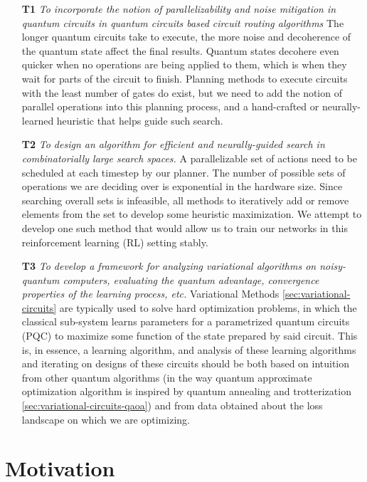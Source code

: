 \begin{enumerate}\label{enum:problems-addressed-by-thesis}
    \item[\textbf{T1}] \textit{To incorporate the notion of parallelizability and noise mitigation in quantum circuits in quantum circuits based circuit routing algorithms}
    The longer quantum circuits take to execute, the more noise and decoherence of the quantum state affect the final results. Quantum states decohere even quicker when no operations are being applied to them, which is when they wait for parts of the circuit to finish. Planning methods to execute circuits with the least number of gates do exist, but we need to add the notion of parallel operations into this planning process, and a hand-crafted or neurally-learned heuristic that helps guide such search.

    \item[\textbf{T2}] \textit{To design an algorithm for efficient and neurally-guided search in combinatorially large search spaces.}
    A parallelizable set of actions need to be scheduled at each timestep by our planner. The number of possible sets of operations we are deciding over is exponential in the hardware size. Since searching overall sets is infeasible, all methods to iteratively add or remove elements from the set to develop some heuristic maximization. We attempt to develop one such method that would allow us to train our networks in this reinforcement learning (RL) setting stably.

    \item[\textbf{T3}] \textit{To develop a framework for analyzing variational algorithms on noisy-quantum computers, evaluating the quantum advantage, convergence properties of the learning process, etc.}
    Variational Methods \ref{sec:variational-circuits} are typically used to solve hard optimization problems, in which the classical sub-system learns parameters for a parametrized quantum circuits (PQC) to maximize some function of the state prepared by said circuit. This is, in essence, a learning algorithm, and analysis of these learning algorithms and iterating on designs of these circuits should be both based on intuition from other quantum algorithms (in the way quantum approximate optimization algorithm is inspired by quantum annealing and trotterization \ref{sec:variational-circuits-qaoa}) and from data obtained about the loss landscape on which we are optimizing.
\end{enumerate}

\section{Motivation}

